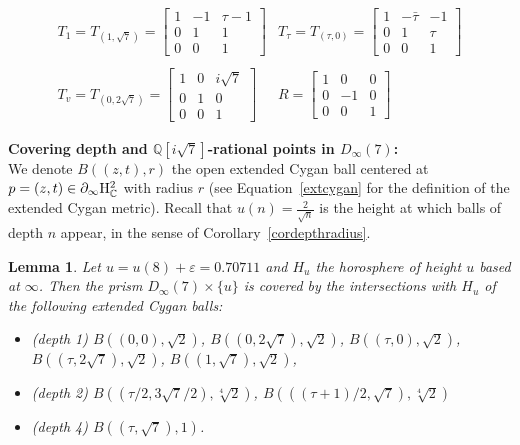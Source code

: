 \documentclass{article}[12pt]
\newcommand{\C}{\mathbb{C}}
\newcommand{\Q}{\mathbb{Q}}
\newtheorem{lem}{Lemma}%
\begin{document}
$$
\begin{array}{cc} T_1=T_{(1,\sqrt{7})}=\left[ \begin{array}{ccc} 1 & -1 & \tau-1 \\ 0 & 1 & 1 \\ 0 & 0 & 1 \end{array}\right] & 
  T_\tau = T_{(\tau,0)}=\left[ \begin{array}{ccc} 1 & -\bar{\tau} & -1 \\ 0 & 1 & \tau \\ 0 & 0 & 1 \end{array}\right] \\
  \\
  T_v=T_{(0,2\sqrt{7})}=\left[ \begin{array}{ccc} 1 & 0 & i\sqrt{7} \\ 0 & 1 & 0 \\ 0 & 0 & 1 \end{array}\right] & 
  R=\left[ \begin{array}{ccc} 1 & 0 & 0 \\ 0 & -1 & 0 \\ 0 & 0 & 1 \end{array}\right]
\end{array}$$

{\bf Covering depth and $\Q[i\sqrt{7}]$-rational points in $D_\infty(7)$:} \\

We denote $B\left((z,t),r\right)$ the open extended Cygan ball centered at $p=(z,t) \in \partial_\infty {\rm H}_\C^2$ with radius $r$ (see Equation~\ref{extcygan} for the definition of the extended Cygan metric). Recall that $u(n)=\frac{2}{\sqrt{n}}$ is the height at which balls of depth $n$ appear, in the sense of Corollary~\ref{cordepthradius}. 

\begin{lem}\label{d=7cover} Let $u=u(8)+\varepsilon=0.70711$ and $H_u$ the horosphere of height $u$ based at $\infty$. Then the prism $D_\infty(7)\times \{ u \}$ is covered by the intersections with $H_u$ of the following extended Cygan balls:
  \begin{itemize}
\item (depth 1)  $B\left((0,0),\sqrt{2}\right)$, $B\left((0,2\sqrt{7}),\sqrt{2}\right)$, $B\left((\tau,0),\sqrt{2}\right)$, $B\left((\tau,2\sqrt{7}),\sqrt{2}\right)$, $B\left((1,\sqrt{7}),\sqrt{2}\right)$,
\item (depth 2) $B\left((\tau/2,3\sqrt{7}/2),\sqrt[4]{2}\right)$, $B\left(((\tau+1)/2,\sqrt{7}),\sqrt[4]{2}\right)$
\item (depth 4) $B\left((\tau,\sqrt{7}),1\right)$.
  \end{itemize}
\end{lem}
\end{document}
